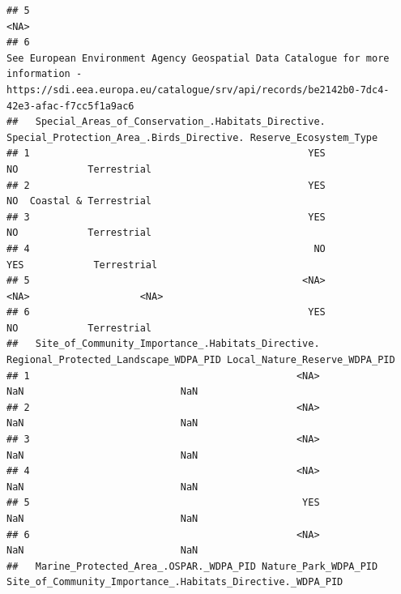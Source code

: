 \documentclass[
]{article}
\begin{document}
\begin{verbatim}
## 5                                                                                                                                                                                                                                                                                                                                                                                                                                 <NA>
## 6                                                                                                                                                                                                                                                            See European Environment Agency Geospatial Data Catalogue for more information - https://sdi.eea.europa.eu/catalogue/srv/api/records/be2142b0-7dc4-42e3-afac-f7cc5f1a9ac6
##   Special_Areas_of_Conservation_.Habitats_Directive. Special_Protection_Area_.Birds_Directive. Reserve_Ecosystem_Type
## 1                                                YES                                        NO            Terrestrial
## 2                                                YES                                        NO  Coastal & Terrestrial
## 3                                                YES                                        NO            Terrestrial
## 4                                                 NO                                       YES            Terrestrial
## 5                                               <NA>                                      <NA>                   <NA>
## 6                                                YES                                        NO            Terrestrial
##   Site_of_Community_Importance_.Habitats_Directive. Regional_Protected_Landscape_WDPA_PID Local_Nature_Reserve_WDPA_PID
## 1                                              <NA>                                   NaN                           NaN
## 2                                              <NA>                                   NaN                           NaN
## 3                                              <NA>                                   NaN                           NaN
## 4                                              <NA>                                   NaN                           NaN
## 5                                               YES                                   NaN                           NaN
## 6                                              <NA>                                   NaN                           NaN
##   Marine_Protected_Area_.OSPAR._WDPA_PID Nature_Park_WDPA_PID Site_of_Community_Importance_.Habitats_Directive._WDPA_PID

\end{verbatim}
\end{document}
